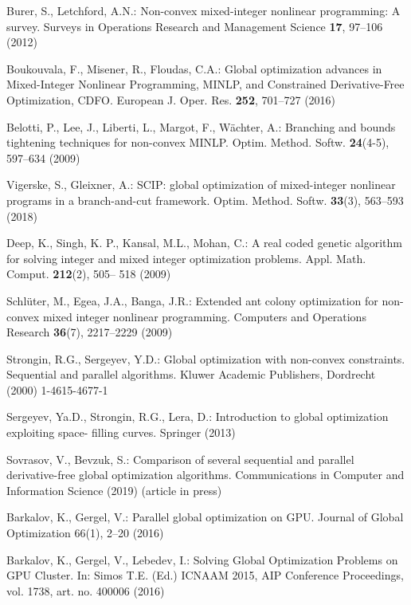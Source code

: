 \documentclass[runningheads]{llncs}
\begin{document}
\begin{thebibliography}{10}

Burer, S., Letchford, A.N.: Non-convex mixed-integer nonlinear programming: A survey.
Surveys in Operations Research and Management Science \textbf{17}, 97--106 (2012)

Boukouvala, F., Misener, R., Floudas, C.A.: Global optimization advances in Mixed-Integer
Nonlinear Programming, MINLP, and Constrained Derivative-Free Optimization, CDFO.
European J. Oper. Res. \textbf{252}, 701--727 (2016)

Belotti, P., Lee, J., Liberti, L., Margot, F., W\"achter, A.: Branching and bounds tightening
techniques for non-convex MINLP. Optim. Method. Softw. \textbf{24}(4-5), 597--634 (2009)

Vigerske, S., Gleixner, A.: SCIP: global optimization of mixed-integer nonlinear programs in a
branch-and-cut framework.
Optim. Method. Softw. \textbf{33}(3), 563--593 (2018)

Deep, K., Singh, K. P., Kansal, M.L., Mohan, C.: A real coded genetic algorithm for solving
integer and mixed integer optimization problems. Appl. Math. Comput. \textbf{212}(2), 505--
518 (2009)

Schl\"uter, M., Egea, J.A., Banga, J.R.: Extended ant colony optimization for non-convex
mixed integer nonlinear programming. Computers and Operations Research \textbf{36}(7),
2217--2229 (2009)

Strongin, R.G., Sergeyev, Y.D.: Global optimization with non-convex constraints. Sequential
and parallel algorithms. Kluwer Academic Publishers, Dordrecht (2000) %
1-4615-4677-1

Sergeyev, Ya.D., Strongin, R.G., Lera, D.: Introduction to global optimization exploiting space-
filling curves. Springer (2013) %

Sovrasov, V., Bevzuk, S.: Comparison of several sequential and parallel derivative-free global optimization algorithms. 	Communications in Computer and Information Science (2019) (article in press)

Barkalov, K., Gergel, V.: Parallel global optimization on GPU. Journal of Global Optimization
66(1), 2--20 (2016)

Barkalov, K., Gergel, V., Lebedev, I.: Solving Global Optimization Problems on GPU Cluster.
In: Simos T.E. (Ed.) ICNAAM 2015, AIP Conference Proceedings, vol. 1738, art. no. 400006
(2016)


\end{thebibliography}
\end{document}
